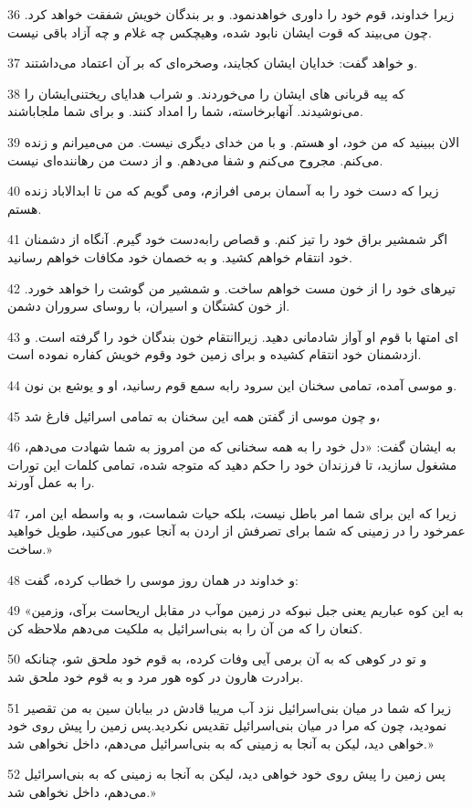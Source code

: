 \par 36 زیرا خداوند، قوم خود را داوری خواهدنمود. و بر بندگان خویش شفقت خواهد کرد. چون می‌بیند که قوت ایشان نابود شده، وهیچکس چه غلام و چه آزاد باقی نیست.
\par 37 و خواهد گفت: خدایان ایشان کجایند، وصخره‌ای که بر آن اعتماد می‌داشتند.
\par 38 که پیه قربانی های ایشان را می‌خوردند. و شراب هدایای ریختنی‌ایشان را می‌نوشیدند. آنهابرخاسته، شما را امداد کنند. و برای شما ملجاباشند.
\par 39 الان ببینید که من خود، او هستم. و با من خدای دیگری نیست. من می‌میرانم و زنده می‌کنم. مجروح می‌کنم و شفا می‌دهم. و از دست من رهاننده‌ای نیست.
\par 40 زیرا که دست خود را به آسمان برمی افرازم، ومی گویم که من تا ابدالاباد زنده هستم.
\par 41 اگر شمشیر براق خود را تیز کنم. و قصاص رابه‌دست خود گیرم. آنگاه از دشمنان خود انتقام خواهم کشید. و به خصمان خود مکافات خواهم رسانید.
\par 42 تیرهای خود را از خون مست خواهم ساخت. و شمشیر من گوشت را خواهد خورد. از خون کشتگان و اسیران، با روسای سروران دشمن.
\par 43 ‌ای امتها با قوم او آواز شادمانی دهید. زیراانتقام خون بندگان خود را گرفته است. و ازدشمنان خود انتقام کشیده و برای زمین خود وقوم خویش کفاره نموده است.
\par 44 و موسی آمده، تمامی سخنان این سرود رابه سمع قوم رسانید، او و یوشع بن نون.
\par 45 و چون موسی از گفتن همه این سخنان به تمامی اسرائیل فارغ شد،
\par 46 به ایشان گفت: «دل خود را به همه سخنانی که من امروز به شما شهادت می‌دهم، مشغول سازید، تا فرزندان خود را حکم دهید که متوجه شده، تمامی کلمات این تورات را به عمل آورند.
\par 47 زیرا که این برای شما امر باطل نیست، بلکه حیات شماست، و به واسطه این امر، عمرخود را در زمینی که شما برای تصرفش از اردن به آنجا عبور می‌کنید، طویل خواهید ساخت.»
\par 48 و خداوند در همان روز موسی را خطاب کرده، گفت:
\par 49 «به این کوه عباریم یعنی جبل نبوکه در زمین موآب در مقابل اریحاست برآی، وزمین کنعان را که من آن را به بنی‌اسرائیل به ملکیت می‌دهم ملاحظه کن.
\par 50 و تو در کوهی که به آن برمی آیی وفات کرده، به قوم خود ملحق شو، چنانکه برادرت هارون در کوه هور مرد و به قوم خود ملحق شد.
\par 51 زیرا که شما در میان بنی‌اسرائیل نزد آب مریبا قادش در بیابان سین به من تقصیر نمودید، چون که مرا در میان بنی‌اسرائیل تقدیس نکردید.پس زمین را پیش روی خود خواهی دید، لیکن به آنجا به زمینی که به بنی‌اسرائیل می‌دهم، داخل نخواهی شد.»
\par 52 پس زمین را پیش روی خود خواهی دید، لیکن به آنجا به زمینی که به بنی‌اسرائیل می‌دهم، داخل نخواهی شد.»
 
